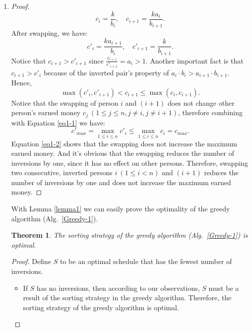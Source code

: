 \documentclass[12pt,a4paper]{article}
\makeatletter
\newtheorem{theorem}{Theorem}
\newtheorem*{solution}{Solution}
\theoremstyle{definition}
\renewenvironment{solution}[1][Solution] {\par\pushQED{\qed}\normalfont\topsep6\p@\@plus6\p@\relax\trivlist\item[\hskip\labelsep\bfseries#1\@addpunct{.}]\ignorespaces}{\popQED\endtrivlist\@endpefalse} \makeatother
\makeatother
\begin{document}
\begin{enumerate}
\begin{solution}
\begin{enumerate}
\begin{proof}
         \begin{displaymath}
         c_i = \frac{k}{b_i}, \quad c_{i+1} = \frac{ka_i}{b_{i+1}}.
         \end{displaymath}
         After swapping, we have:
         \begin{displaymath}
         c'_i = \frac{ka_{i+1}}{b_i}, \quad c'_{i+1} = \frac{k}{b_{i+1}}.
         \end{displaymath}
         Notice that $c_{i+1} > c'_{i+1}$ since $\frac{c_{i+1}}{c'_{i+1}} = a_i > 1$. Another important fact is that $c_{i+1} > c'_i$ because of the inverted pair's property of $a_i\cdot b_i > a_{i+1}\cdot b_{i+1}$. Hence,
         \begin{equation}
         \max(c'_i, c'_{i+1}) < c_{i+1} \leq \max(c_i, c_{i+1}).
         \label{eq1-1}
         \end{equation}
         Notice that the swapping of person $i$ and $(i+1)$ does not change other person's earned money $c_j\ (1 \leq j \leq n, j \ne i, j\ne i+1)$, therefore combining with Equation \eqref{eq1-1} we have:
         \begin{equation}
         c'_{max} = \max\limits_{1\leq i\leq n} c'_i \leq \max\limits_{1\leq i\leq n} c_i = c_{max}.
         \label{eq1-2}
         \end{equation}
         Equation \eqref{eq1-2} shows that the swapping does not increase the maximum earned money. And it's obvious that the swapping reduces the number of inversions by one, since it has no effect on other persons. Therefore, swapping two consecutive, inverted persons $i\ (1 \leq i < n)$ and $(i+1)$ reduces the number of inversions by one and does not increase the maximum earned money.
         \end{proof}
         With Lemma \ref{lemma1} we can easily prove the optimality of the greedy algorithm (Alg.~\ref{Greedy-1}).
         \begin{theorem}
         The sorting strategy of the greedy algorithm (Alg.~\ref{Greedy-1}) is optimal.
         \end{theorem}
         \begin{proof}
         Define $S$ to be an optimal schedule that has the fewest number of inversions.
         \begin{itemize}
         \item If $S$ has no inversions, then according to our observations, $S$ must be a result of the sorting strategy in the greedy algorithm. Therefore, the sorting strategy of the greedy algorithm is optimal.

\end{itemize}
\end{proof}
\end{enumerate}
\end{solution}
\end{enumerate}
\end{document}
